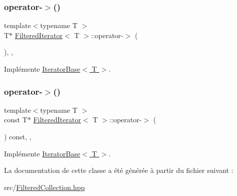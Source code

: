\subsubsection{\texorpdfstring{operator-\/$>$()}{operator->()}\hspace{0.1cm}{\footnotesize\ttfamily [1/2]}}
{\footnotesize\ttfamily template$<$typename T $>$ \\
T$\ast$ \hyperlink{class_filtered_iterator}{Filtered\+Iterator}$<$ T $>$\+::operator-\/$>$ (\begin{DoxyParamCaption}{ }\end{DoxyParamCaption})\hspace{0.3cm}{\ttfamily [inline]}, {\ttfamily [override]}, {\ttfamily [virtual]}}



Implémente \hyperlink{class_iterator_base_aad2254f7877e4647f699ceb455e893ff}{Iterator\+Base$<$ T $>$}.

\mbox{\label{class_filtered_iterator_a75ea4ec86c45f496c1515e8e9832cd0f}} 
\subsubsection{\texorpdfstring{operator-\/$>$()}{operator->()}\hspace{0.1cm}{\footnotesize\ttfamily [2/2]}}
{\footnotesize\ttfamily template$<$typename T $>$ \\
const T$\ast$ \hyperlink{class_filtered_iterator}{Filtered\+Iterator}$<$ T $>$\+::operator-\/$>$ (\begin{DoxyParamCaption}{ }\end{DoxyParamCaption}) const\hspace{0.3cm}{\ttfamily [inline]}, {\ttfamily [override]}, {\ttfamily [virtual]}}



Implémente \hyperlink{class_iterator_base_a49d96fd63062ca0d7fd813517ad69f03}{Iterator\+Base$<$ T $>$}.



La documentation de cette classe a été générée à partir du fichier suivant \+:\begin{DoxyCompactItemize}
\item 
src/\hyperlink{_filtered_collection_8hpp}{Filtered\+Collection.\+hpp}\end{DoxyCompactItemize}
